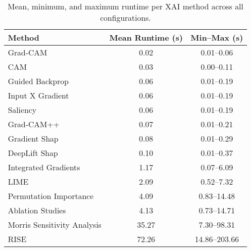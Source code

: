 \begin{table}[ht]
\centering
\begin{tabular}{lcc}
\toprule
Method & Mean Runtime (s) & Min--Max (s) \\
\midrule
Grad-CAM & 0.02 & 0.01--0.06 \\
CAM & 0.03 & 0.00--0.11 \\
Guided Backprop & 0.06 & 0.01--0.19 \\
Input X Gradient & 0.06 & 0.01--0.19 \\
Saliency & 0.06 & 0.01--0.19 \\
Grad-CAM++ & 0.07 & 0.01--0.21 \\
Gradient Shap & 0.08 & 0.01--0.29 \\
DeepLift Shap & 0.10 & 0.01--0.37 \\
Integrated Gradients & 1.17 & 0.07--6.09 \\
LIME & 2.09 & 0.52--7.32 \\
Permutation Importance & 4.09 & 0.83--14.48 \\
Ablation Studies & 4.13 & 0.73--14.71 \\
Morris Sensitivity Analysis & 35.27 & 7.30--98.31 \\
RISE & 72.26 & 14.86--203.66 \\
\bottomrule
\end{tabular}
\caption{Mean, minimum, and maximum runtime per XAI method across all configurations.}
\label{tab:runtime_all_minmax}
\end{table}

